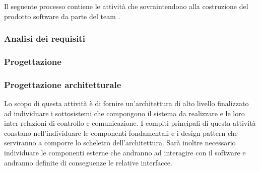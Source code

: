 Il seguente processo contiene le attività che sovraintendono alla costruzione del prodotto software da parte del team \GRUPPO. 

\subsubsection{Analisi dei requisiti}


\newpage
\subsubsection{Progettazione}


\newpage
\subsubsection{Progettazione architetturale}
Lo scopo di questa attività è di fornire un'architettura di alto livello finalizzato ad individuare i sottosistemi che compongono il sistema da realizzare e le loro inter-relazioni di controllo e comunicazione. I compiti principali di questa attività constano nell'individuare le componenti fondamentali e i design pattern che serviranno a comporre lo scheletro dell'architettura. Sarà inoltre necessario individuare le componenti esterne che andranno ad interagire con il software e andranno definite di conseguenze le relative interfacce.

